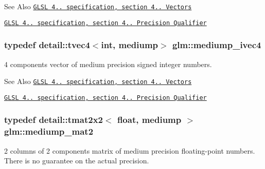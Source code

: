 \begin{DoxySeeAlso}{See Also}
\href{http://www.opengl.org/registry/doc/GLSLangSpec.4.20.8.pdf}{\tt G\-L\-S\-L 4.. specification, section 4.. Vectors} 

\href{http://www.opengl.org/registry/doc/GLSLangSpec.4.20.8.pdf}{\tt G\-L\-S\-L 4.. specification, section 4.. Precision Qualifier} 
\end{DoxySeeAlso}
\hypertarget{group__core__precision_gaa4c23a132d76436e041747b0c03265ad}{
\subsubsection[{mediump\-\_\-ivec4}]{\setlength{\rightskip}{0pt plus 5cm}typedef detail\-::tvec4$<$int, mediump$>$ {\bf glm\-::mediump\-\_\-ivec4}}}\label{group__core__precision_gaa4c23a132d76436e041747b0c03265ad}
4 components vector of medium precision signed integer numbers.

\begin{DoxySeeAlso}{See Also}
\href{http://www.opengl.org/registry/doc/GLSLangSpec.4.20.8.pdf}{\tt G\-L\-S\-L 4.. specification, section 4.. Vectors} 

\href{http://www.opengl.org/registry/doc/GLSLangSpec.4.20.8.pdf}{\tt G\-L\-S\-L 4.. specification, section 4.. Precision Qualifier} 
\end{DoxySeeAlso}
\hypertarget{group__core__precision_ga6ed8bfa67b72cea216cb558411f95f86}{
\subsubsection[{mediump\-\_\-mat2}]{\setlength{\rightskip}{0pt plus 5cm}typedef detail\-::tmat2x2$<$ float, mediump $>$ {\bf glm\-::mediump\-\_\-mat2}}}\label{group__core__precision_ga6ed8bfa67b72cea216cb558411f95f86}
2 columns of 2 components matrix of medium precision floating-\/point numbers. There is no guarantee on the actual precision.

